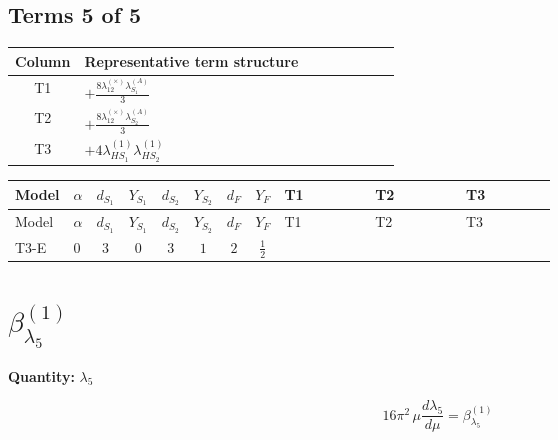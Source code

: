 \documentclass[8pt]{article}
\begin{document}
\begin{landscape}
\subsection*{Terms 5 of 5}
\begin{center}
\begin{tabular}{@{}c >{\raggedright\arraybackslash}p{0.82\linewidth}@{}}
\toprule
Column & Representative term structure \\
\midrule
T1 & \(\displaystyle +\frac{8 {\lambda_{12}^{(\times)}} {\lambda_{S_1}^{(A)}}}{3}\) \\
\midrule
T2 & \(\displaystyle +\frac{8 {\lambda_{12}^{(\times)}} {\lambda_{S_2}^{(A)}}}{3}\) \\
\midrule
T3 & \(\displaystyle +4 {\lambda_{HS_1}^{(1)}} {\lambda_{HS_2}^{(1)}}\) \\
\midrule
\bottomrule
\end{tabular}
\end{center}
\smallskip
\tiny
\begin{longtable}{@{}llcccccc >{\raggedright\arraybackslash}p{0.21\linewidth} >{\raggedright\arraybackslash}p{0.21\linewidth} >{\raggedright\arraybackslash}p{0.21\linewidth}@{}}
\toprule
Model & $\alpha$ & $d_{S_1}$ & $Y_{S_1}$ & $d_{S_2}$ & $Y_{S_2}$ & $d_F$ & $Y_F$ & T1 & T2 & T3 \\
\midrule
\endfirsthead
\toprule
Model & $\alpha$ & $d_{S_1}$ & $Y_{S_1}$ & $d_{S_2}$ & $Y_{S_2}$ & $d_F$ & $Y_F$ & T1 & T2 & T3 \\
\midrule
\endhead
T3-E & $0$ & $3$ & $0$ & $3$ & $1$ & $2$ & $\frac{1}{2}$ & \scriptsize\adjustbox{max width=\linewidth}{$\begin{gathered} +\frac{8 {\lambda_{12}^{(\times)}} {\lambda_{S_1}^{(A)}}}{3}\end{gathered}$} & \scriptsize\adjustbox{max width=\linewidth}{$\begin{gathered} +\frac{8 {\lambda_{12}^{(\times)}} {\lambda_{S_2}^{(A)}}}{3}\end{gathered}$} & \scriptsize\adjustbox{max width=\linewidth}{$\begin{gathered} +4 {\lambda_{HS_1}^{(1)}} {\lambda_{HS_2}^{(1)}}\end{gathered}$} \\
\midrule
\bottomrule
\end{longtable}
\clearpage
\section*{$\beta_{\lambda_5}^{(1)}$}
\noindent\textbf{Quantity: }$\lambda_5$\par\smallskip
\[16\pi^2\,\mu\frac{d \lambda_5}{d\mu}=\beta_{\lambda_5}^{(1)}\]

\end{landscape}
\end{document}
